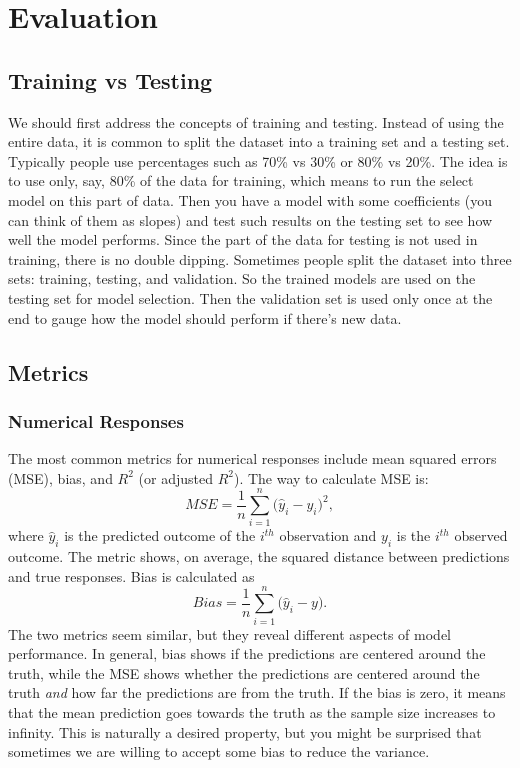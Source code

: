 \documentclass[
]{book}
\begin{document}
\hypertarget{evaluation}{%
\chapter{Evaluation}\label{evaluation}}

\hypertarget{training-vs-testing}{%
\section{Training vs Testing}\label{training-vs-testing}}

We should first address the concepts of training and testing. Instead of using the entire data, it is common to split the dataset into a training set and a testing set. Typically people use percentages such as 70\% vs 30\% or 80\% vs 20\%. The idea is to use only, say, 80\% of the data for training, which means to run the select model on this part of data. Then you have a model with some coefficients (you can think of them as slopes) and test such results on the testing set to see how well the model performs. Since the part of the data for testing is not used in training, there is no double dipping. Sometimes people split the dataset into three sets: training, testing, and validation. So the trained models are used on the testing set for model selection. Then the validation set is used only once at the end to gauge how the model should perform if there's new data.

\hypertarget{metrics}{%
\section{Metrics}\label{metrics}}

\hypertarget{numerical-responses}{%
\subsection{Numerical Responses}\label{numerical-responses}}

The most common metrics for numerical responses include mean squared errors (MSE), bias, and \(R^2\) (or adjusted \(R^2\)). The way to calculate MSE is:
\[MSE = \frac{1}{n} \sum_{i=1}^n \bigg( \hat{y}_i - y_i \bigg)^2,\]
where \(\hat{y}_i\) is the predicted outcome of the \(i^{th}\) observation and \(y_i\) is the \(i^{th}\) observed outcome. The metric shows, on average, the squared distance between predictions and true responses. Bias is calculated as
\[Bias = \frac{1}{n} \sum_{i=1}^n \bigg( \hat{y}_i - y \bigg).\]
The two metrics seem similar, but they reveal different aspects of model performance. In general, bias shows if the predictions are centered around the truth, while the MSE shows whether the predictions are centered around the truth \emph{and} how far the predictions are from the truth. If the bias is zero, it means that the mean prediction goes towards the truth as the sample size increases to infinity. This is naturally a desired property, but you might be surprised that sometimes we are willing to accept some bias to reduce the variance.
\end{document}
